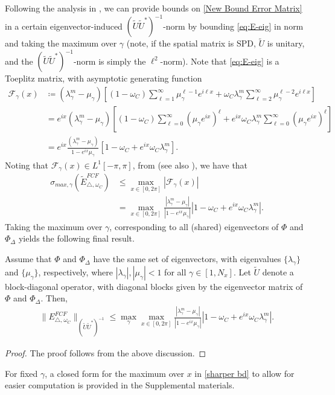 \documentclass[VANCOUVER,STIX1COL]{WileyNJD-v2}
\begin{document}
Following the analysis in \cite{Do2016,So2019}, we can provide bounds on \eqref{New Bound Error Matrix} in a certain eigenvector-induced $(\widetilde{U}\widetilde{U}^*)^{-1}$-norm by bounding \eqref{eq:E-eig} in norm and taking the maximum over $\gamma$ (note, if the spatial matrix is SPD, $\widetilde{U}$ is unitary, and the $(\widetilde{U}\widetilde{U}^*)^{-1}$-norm is simply the $\ell^2$-norm).
Note that \eqref{eq:E-eig} is a Toeplitz matrix, with asymptotic generating function
\begin{align*}
\mathcal{F}_\gamma(x) & \coloneqq (\lambda_\gamma^m - \mu_\gamma)\left[
	(1-\omega_C)\sum_{\ell=1}^{\infty} \mu_\gamma^{\ell-1}e^{i\ell x} + 
	\omega_C\lambda_\gamma^m \sum_{\ell=2}^{\infty} \mu_\gamma^{\ell-2}e^{i\ell x}\right] \\
& = e^{ix}(\lambda_\gamma^m - \mu_\gamma)\left[
	(1-\omega_C)\sum_{\ell=0}^{\infty} (\mu_\gamma e^{i x})^{\ell} + 
	e^{ix}\omega_C\lambda_\gamma^m \sum_{\ell=0}^{\infty} (\mu_\gamma e^{i x})^{\ell}\right] \\
& = e^{ix} \frac{(\lambda_\gamma^m - \mu_\gamma)}{1 - e^{ix}\mu_\gamma}\left[1-\omega_C
	+ e^{ix}\omega_C\lambda_\gamma^m\right].
\end{align*}
%
Noting that $\mathcal{F}_\gamma(x)\in L^1[-\pi,\pi]$, from \cite{widom1989singular} (see also
\cite[Th. 2.1]{capizzano1999extreme}), we have that
%
\begin{align}\nonumber
\sigma_{max, \gamma}(\widetilde{E}_{\triangle, \hspace{1pt} \omega_C}^{FCF}) & \leq \max_{x\in[0,2\pi]} |\mathcal{F}_\gamma(x)| \\
& = \max_{x\in[0,2\pi]} \frac{|\lambda_\gamma^m - \mu_\gamma|}{|1 - e^{ix}\mu_\gamma|}
	|1-\omega_C + e^{ix}\omega_C\lambda_\gamma^m| \label{eq:bound}.
\end{align}
%
Taking the maximum over $\gamma$, corresponding to all (shared) eigenvectors of
$\Phi$ and $\Phi_\Delta$ yields the following final result.
%
\begin{theorem}\label{th:bound}
Assume that $\Phi$ and $\Phi_\Delta$ have the same set of eigenvectors, with eigenvalues
$\{\lambda_{\gamma}\}$ and $\{\mu_{\gamma}\}$, respectively, where $|\lambda_\gamma|,
|\mu_\gamma| < 1$ for all $\gamma\in[1,N_x]$. Let $\widetilde{U}$ denote a block-diagonal operator,
with diagonal blocks given by the eigenvector matrix of $\Phi$ and $\Phi_\Delta$. Then,
\begin{align} \label{sharper bd}
\|E_{\triangle, \hspace{1pt} \omega_C}^{FCF}\|_{(\widetilde{U}\widetilde{U}^*)^{-1}} \leq
    \max_\gamma \max_{x\in[0,2\pi]} \frac{|\lambda_\gamma^m - \mu_\gamma|}{|1 - e^{ix}\mu_\gamma|}
	|1-\omega_C + e^{ix}\omega_C\lambda_\gamma^m|.
\end{align}
\end{theorem}
\begin{proof}
The proof follows from the above discussion.
\end{proof}
%
For fixed $\gamma$, a closed form for the maximum over $x$ in \eqref{sharper bd} to
allow for easier computation is provided in the Supplemental materials.
\end{document}
